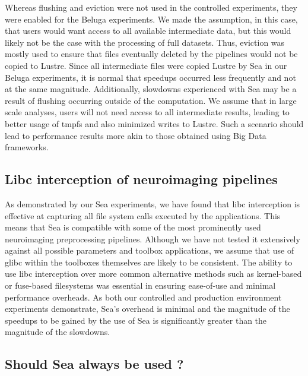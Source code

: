     Whereas flushing and eviction were not used in the controlled experiments,
    they were enabled for the Beluga experiments. We made the assumption, in
    this case, that users would want access to all available intermediate data,
    but this would likely not be the case with the processing of full datasets.
    Thus, eviction was mostly used to ensure that files eventually deleted by the
    pipelines would not be copied to Lustre. Since all intermediate files were
    copied Lustre by Sea in our Beluga experiments, it is normal that speedups
    occurred less frequently and not at the same magnitude. Additionally, slowdowns
    experienced with Sea may be a result of flushing occurring outside of the computation.
    We assume that in large scale analyses, users will not need access to all intermediate
    results, leading to better usage of tmpfs and also minimized writes to Lustre. Such a
    scenario should lead to performance results more akin to those obtained using Big Data
    frameworks.

    \subsection{Libc interception of neuroimaging pipelines}
    
    As demonstrated by our Sea experiments, we have found that libc interception
    is effective at capturing all file system calls executed by the
    applications. This means that Sea is compatible with some of the most prominently
    used neuroimaging preprocessing pipelines. Although we have not tested it extensively
    against all possible parameters and toolbox applications, we assume that use
    of glibc within the toolboxes themselves are likely to be consistent.
    The ability to use libc interception over more common alternative methods
    such as kernel-based or fuse-based filesystems was essential in ensuring
    ease-of-use and minimal performance overheads. As both our controlled and production
    environment experiments demonstrate, Sea's overhead is minimal and the magnitude of the
    speedups to be gained by the use of Sea is significantly greater than the magnitude of the
    slowdowns.
    
    \subsection{Should Sea always be used ?}
    
